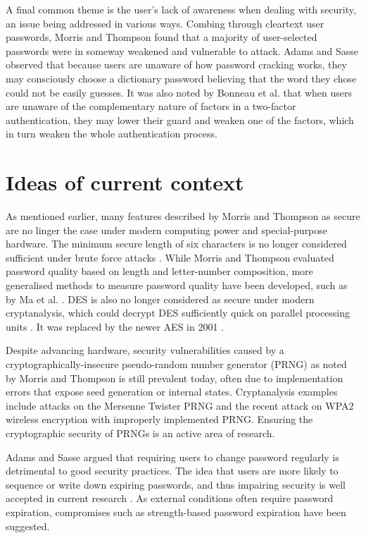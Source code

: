 \documentclass[11pt]{article}
\begin{document}
A final common theme is the user's lack of awareness when dealing with security, an issue being addressed in various ways. Combing through cleartext user passwords, Morris and Thompson \cite[p. 596]{morris1979password} found that a majority of user-selected passwords were in someway weakened and vulnerable to attack. Adams and Sasse \cite[p. 3]{adams1999users} observed that because users are unaware of how password cracking works, they may consciously choose a dictionary password believing that the word they chose could not be easily guesses. It was also noted by Bonneau et al. \cite[Sec. V]{bonneau2012quest} that when users are unaware of the complementary nature of factors in a two-factor authentication, they may lower their guard and weaken one of the factors, which in turn weaken the whole authentication process.

\section{Ideas of current context}

As mentioned earlier, many features described by Morris and Thompson \cite{morris1979password} as secure are no linger the case under modern computing power and special-purpose hardware. The minimum secure length of six characters is no longer considered sufficient under brute force attacks \cite{weir2010testing}. While Morris and Thompson evaluated password quality based on length and letter-number composition, more generalised methods to measure password quality have been developed, such as by Ma et al. \cite{ma2010password}. DES is also no longer considered as secure under modern cryptanalysis, which could decrypt DES sufficiently quick on parallel processing units \cite{biham1993differential}. It was replaced by the newer AES in 2001 \cite{standard2001announcing}.

Despite advancing hardware, security vulnerabilities caused by a cryptographically-insecure pseudo-random number generator (PRNG) as noted by Morris and Thompson \cite[p. 596]{morris1979password} is still prevalent today, often due to implementation errors that expose seed generation or internal states. Cryptanalysis examples include attacks on the Mersenne Twister PRNG \cite{argyros2012forgot} and the recent attack on WPA2 wireless encryption \cite{vanhoef2017key} with improperly implemented PRNG. Ensuring the cryptographic security of PRNGs is an active area of research.

Adams and Sasse \cite{adams1999users} argued that requiring users to change password regularly is detrimental to good security practices. The idea that users are more likely to sequence or write down expiring passwords, and thus impairing security is well accepted in current research \cite{zhang2010security, chiasson2015quantifying}. As external conditions often require password expiration, compromises such as strength-based password expiration \cite{johansson2015strength} have been suggested.
\end{document}
